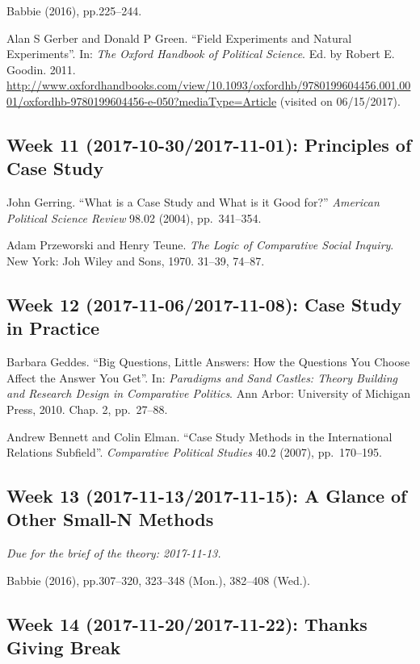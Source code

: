 \documentclass[11pt,]{article}
\theoremstyle{definition}
\theoremstyle{definition}
\theoremstyle{definition}
\theoremstyle{remark}
\begin{document}
Babbie (2016), pp.225--244.

Alan S Gerber and Donald P Green. ``Field Experiments and Natural
Experiments''. In: \emph{The Oxford Handbook of Political Science}. Ed.
by Robert E. Goodin. 2011.
\url{http://www.oxfordhandbooks.com/view/10.1093/oxfordhb/9780199604456.001.0001/oxfordhb-9780199604456-e-050?mediaType=Article}
(visited on 06/15/2017).

\subsection{Week 11 (2017-10-30/2017-11-01): Principles of Case
Study}\label{week-11-2017-10-302017-11-01-principles-of-case-study}

John Gerring. ``What is a Case Study and What is it Good for?''
\emph{American Political Science Review} 98.02 (2004), pp.~341--354.

Adam Przeworski and Henry Teune.
\emph{The Logic of Comparative Social Inquiry}. New York: Joh Wiley and
Sons, 1970. 31--39, 74--87.

\subsection{Week 12 (2017-11-06/2017-11-08): Case Study in
Practice}\label{week-12-2017-11-062017-11-08-case-study-in-practice}

Barbara Geddes. ``Big Questions, Little Answers: How the Questions You
Choose Affect the Answer You Get''. In:
\emph{Paradigms and Sand Castles: Theory Building and Research Design in Comparative Politics}.
Ann Arbor: University of Michigan Press, 2010. Chap. 2, pp.~27--88.

Andrew Bennett and Colin Elman. ``Case Study Methods in the
International Relations Subfield''. \emph{Comparative Political Studies}
40.2 (2007), pp.~170--195.

\subsection{Week 13 (2017-11-13/2017-11-15): A Glance of Other Small-N
Methods}\label{week-13-2017-11-132017-11-15-a-glance-of-other-small-n-methods}

\emph{Due for the brief of the theory: 2017-11-13.}

Babbie (2016), pp.307--320, 323--348 (Mon.), 382--408 (Wed.).

\subsection{Week 14 (2017-11-20/2017-11-22): Thanks Giving
Break}\label{week-14-2017-11-202017-11-22-thanks-giving-break}
\end{document}
